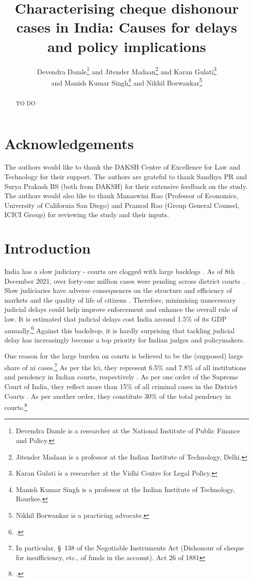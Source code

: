 \documentclass[12pt,a4paper]{article}
\title{Characterising cheque dishonour cases in India: Causes for delays and policy implications}
\author{Devendra Damle\thanks{Devendra Damle is a researcher at the National Institute of Public Finance and Policy.} and Jitender Madaan\thanks{Jitender Madaan is a professor at the Indian Institute of Technology, Delhi.} and Karan Gulati\thanks{Karan Gulati is a researcher at the Vidhi Centre for Legal Policy.}\\ and Manish Kumar Singh\thanks{Manish Kumar Singh is a professor at the Indian Institute of Technology, Rourkee.} and Nikhil Borwankar\thanks{Nikhil Borwankar is a practicing advocate.}}
\begin{document}
\maketitle

\begin{abstract}
TO DO
\end{abstract}

\newpage
\tableofcontents
\newpage
\printglossaries
\listoftables
\newpage

\section*{Acknowledgements}
The authors would like to thank the DAKSH Centre of Excellence for Law and Technology for their support. The authors are grateful to thank Sandhya PR and Surya Prakash BS (both from DAKSH) for their extensive feedback on the study. The authors would also like to thank Manaswini Rao (Professor of Economics, University of California San Diego) and Pramod Rao (Group General Counsel, ICICI Group) for reviewing the study and their inputs.

\newpage
\section{Introduction}
\label{sec:introduction}
India has a slow judiciary - courts are clogged with large backlogs \autocite{moog1992delays, debroy2008justice, dutta2019modernise}. As of 8th December 2021, over forty-one million cases were pending across district courts \autocite{njdg2021}. Slow judiciaries have adverse consequences on the structure and efficiency of markets and the quality of life of citizens \autocite{world2004world, chemin2007impact, rao2020institutional}. Therefore, minimising unnecessary judicial delays could help improve enforcement and enhance the overall rule of law. It is estimated that judicial delays cost India around 1.5\% of its GDP annually.\footcite{dey2016_cost} Against this backdrop, it is hardly surprising that tackling judicial delay has increasingly become a top priority for Indian judges and policymakers.

One reason for the large burden on courts is believed to be the (supposed) large share of \gls{ni} cases.\footnote{In particular, \S~138 of the Negotiable Instruments Act (Dishonour of cheque for insufficiency, etc., of funds in the account). Act 26 of 1881} As per the \gls{lci}, they represent 6.5\% and 7.8\% of all institutions and pendency in Indian courts, respectively \autocite{lci2014_arrears}. As per one order of the Supreme Court of India, they reflect more than 15\% of all criminal cases in the District Courts \autocite{sc2020_makwanavstate}. As per another order, they constitute 30\% of the total pendency in courts.\footcite[Similarly, a study published by the Department of Justice briefly touches on the burden of such cases on the judiciary and posits that they constitute 34\% of pending criminal cases in Maharashtra.][]{sc2020_138, mahadik2018_maharashtra}
\end{document}

